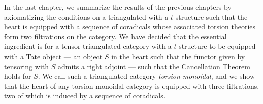 In the last chapter, we summarize the results of the previous 
chapters by axiomatizing the conditions on a triangulated with a 
$t$-structure such that the heart is equipped with a sequence of 
coradicals whose associated torsion theories form two filtrations 
on the category. We have decided that the essential ingredient is 
for a tensor triangulated category with a $t$-structure to be 
equipped with a Tate object --- an object $S$ in the heart such 
that the functor given by tensoring with $S$ admits a right 
adjoint --- such that the Cancellation Theorem holds for $S$. We 
call such a triangulated category \emph{torsion monoidal}, and we 
show that the heart of any torsion monoidal category is equipped
with three filtrations, two of which is induced by a sequence of
coradicals.
